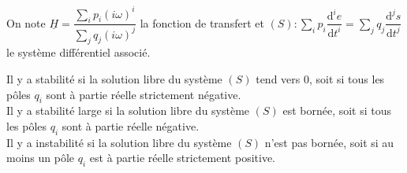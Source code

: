 \documentclass[a4paper]{article}
\begin{document}
\pagestyle{fancy}
\fancyhf{}
\setlength{\headheight}{15pt}

\begin{center}
	\large{}
\end{center}


On note \(\underline{H}=\dfrac{\sum\limits_{i}p_i(i\omega)^{i}}{\sum\limits_{j}q_j(i\omega)^j}\) la fonction de transfert et \((S):\sum\limits_{i}p_i\dfrac{\mathrm{d}^ie}{\mathrm{d}t^i}=\sum\limits_{j}q_j\dfrac{\mathrm{d}^js}{\mathrm{d}t^j}\) le système différentiel associé.

Il y a stabilité si la solution libre du système \((S)\) tend vers \(0\), soit si tous les pôles \(q_i\) sont à partie réelle strictement négative.\\
Il y a stabilité large si la solution libre du système \((S)\) est bornée, soit si tous les pôles \(q_i\) sont à partie réelle négative.\\
Il y a instabilité si la solution libre du système \((S)\) n'est pas bornée, soit si au moins un pôle \(q_i\) est à partie réelle strictement positive.
\end{document}
